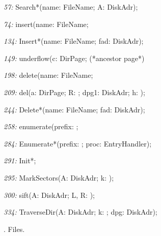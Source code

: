 \item{\it 57:} Search*(name: FileName; \VAR A: DiskAdr);
\item{\it 74:} insert(name: FileName;
\item{\it 134:} Insert*(name: FileName; fad: DiskAdr);
\item{\it 149:} underflow(\VAR c: DirPage;  (*ancestor page*)
\item{\it 198:} delete(name: FileName;
\item{\it 209:} del(\VAR a: DirPage; R: \INTEGER; dpg1: DiskAdr; \VAR h: \BOOLEAN);
\item{\it 244:} Delete*(name: FileName; \VAR fad: DiskAdr);
\item{\it 258:} enumerate(prefix:   \ARRAYOF\CHAR;
\item{\it 284:} Enumerate*(prefix: \ARRAYOF\CHAR; proc: EntryHandler);
\item{\it 291:} Init*;
\item{\it 295:} MarkSectors(\VAR A: \ARRAYOF DiskAdr; k: \INTEGER);
\item{\it 300:} sift(\VAR A: \ARRAYOF DiskAdr; L, R: \INTEGER);
\item{\it 334:} TraverseDir(\VAR A: \ARRAYOF DiskAdr; \VAR k: \INTEGER; dpg: DiskAdr);

. Files.


